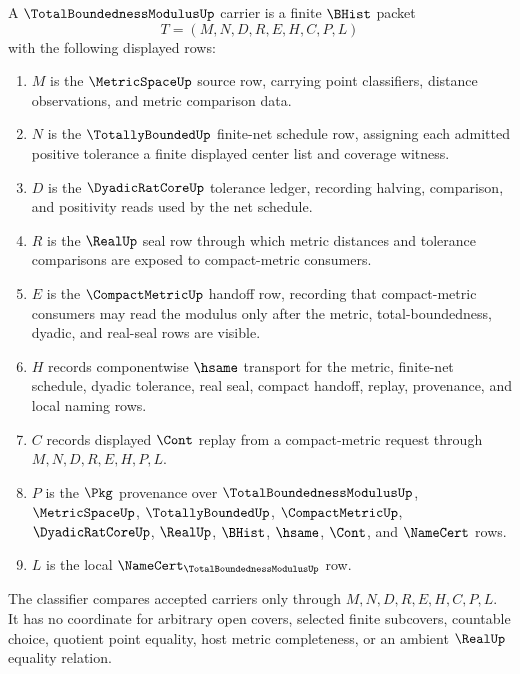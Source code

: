 \begin{definition}
\label{def:total-boundedness-modulus-carrier}
A $\TotalBoundednessModulusUp$ carrier is a finite $\BHist$ packet
$$
T=(M,N,D,R,E,H,C,P,L)
$$
with the following displayed rows:
\begin{enumerate}
\item $M$ is the $\MetricSpaceUp$ source row, carrying point classifiers, distance observations, and metric comparison data.
\item $N$ is the $\TotallyBoundedUp$ finite-net schedule row, assigning each admitted positive tolerance a finite displayed center list and coverage witness.
\item $D$ is the $\DyadicRatCoreUp$ tolerance ledger, recording halving, comparison, and positivity reads used by the net schedule.
\item $R$ is the $\RealUp$ seal row through which metric distances and tolerance comparisons are exposed to compact-metric consumers.
\item $E$ is the $\CompactMetricUp$ handoff row, recording that compact-metric consumers may read the modulus only after the metric, total-boundedness, dyadic, and real-seal rows are visible.
\item $H$ records componentwise $\hsame$ transport for the metric, finite-net schedule, dyadic tolerance, real seal, compact handoff, replay, provenance, and local naming rows.
\item $C$ records displayed $\Cont$ replay from a compact-metric request through $M,N,D,R,E,H,P,L$.
\item $P$ is the $\Pkg$ provenance over $\TotalBoundednessModulusUp$, $\MetricSpaceUp$, $\TotallyBoundedUp$, $\CompactMetricUp$, $\DyadicRatCoreUp$, $\RealUp$, $\BHist$, $\hsame$, $\Cont$, and $\NameCert$ rows.
\item $L$ is the local $\NameCert_{\TotalBoundednessModulusUp}$ row.
\end{enumerate}
The classifier compares accepted carriers only through $M,N,D,R,E,H,C,P,L$. It has no coordinate for arbitrary open covers, selected finite subcovers, countable choice, quotient point equality, host metric completeness, or an ambient $\RealUp$ equality relation.
\end{definition}

